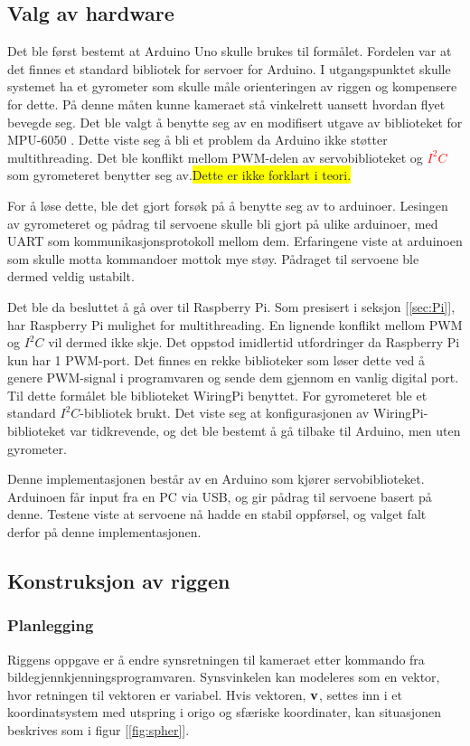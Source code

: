 \subsection{Valg av hardware}

Det ble først bestemt at Arduino Uno skulle brukes til formålet. Fordelen var at det finnes et standard bibliotek for servoer for Arduino. I utgangspunktet skulle systemet ha et gyrometer som skulle måle orienteringen av riggen og kompensere for dette. På denne måten kunne kameraet stå vinkelrett uansett hvordan flyet bevegde seg. Det ble valgt å benytte seg av en modifisert utgave av biblioteket for MPU-6050 \cite{GyroLib}. Dette viste seg å bli et problem da Arduino ikke støtter multithreading. Det ble konflikt mellom PWM-delen av servobiblioteket og \textcolor{red}{$I^2C$} som gyrometeret benytter seg av.\colorbox{yellow}{Dette er ikke forklart i teori.}

For å løse dette, ble det gjort forsøk på å benytte seg av to arduinoer. Lesingen av gyrometeret og pådrag til servoene skulle bli gjort på ulike arduinoer, med UART som kommunikasjonsprotokoll mellom dem. Erfaringene viste at arduinoen som skulle motta kommandoer mottok mye støy. Pådraget til servoene ble dermed veldig ustabilt.

Det ble da besluttet å gå over til Raspberry Pi. Som presisert i seksjon [\ref{sec:Pi}], har Raspberry Pi mulighet for multithreading. En lignende konflikt mellom PWM og $I^2C$ vil dermed ikke skje. Det oppstod imidlertid utfordringer da Raspberry Pi kun har 1 PWM-port. Det finnes en rekke biblioteker som løser dette ved å genere PWM-signal i programvaren og sende dem gjennom en vanlig digital port. Til dette formålet ble biblioteket WiringPi \cite{WirPi} benyttet. For gyrometeret ble et standard $I^2C$-bibliotek brukt. Det viste seg at konfigurasjonen av WiringPi-biblioteket var tidkrevende, og det ble bestemt å gå tilbake til Arduino, men uten gyrometer.

Denne implementasjonen består av en Arduino som kjører servobiblioteket. Arduinoen får input fra en PC via USB, og gir pådrag til servoene basert på denne. Testene viste at servoene nå hadde en stabil oppførsel, og valget falt derfor på denne implementasjonen.

\subsection{Konstruksjon av riggen}

\subsubsection{Planlegging}
Riggens oppgave er å endre synsretningen til kameraet etter kommando fra bildegjennkjenningsprogramvaren. Synsvinkelen kan modeleres som en vektor, hvor retningen til vektoren er variabel. Hvis vektoren, $\bf{v}$, settes inn i et koordinatsystem med utspring i origo og sfæriske koordinater, kan situasjonen beskrives som i figur [\ref{fig:spher}].

